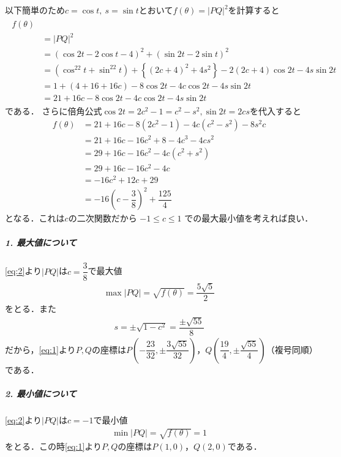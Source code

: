 \documentclass[../../main.tex]{subfiles}
\begin{document}
以下簡単のため$c=\cos t,\ s=\sin t$とおいて$f(\theta)=|PQ|^2$を計算すると
\begin{align}
  \begin{split}
    f(\theta) \\
    &=|PQ|^2 \\
    &=(\cos2t-2\cos t-4)^2+(\sin2t-2\sin t)^2 \\
    &=(\cos^22t+\sin^22t)+\left\{(2c+4)^2+4s^2\right\}-2(2c+4)\cos2t-4s\sin2t \\
    &=1+(4+16+16c)-8\cos 2t - 4c\cos 2t-4s\sin 2t \\
    &=21+16c-8\cos 2t - 4c\cos 2t-4s\sin 2t
  \end{split}
\end{align}
である．
さらに倍角公式$\cos 2t = 2c^2-1 = c^2-s^2, \sin 2t = 2cs$を代入すると
\begin{align}
  f(\theta)
  &= 21+16c-8(2c^2-1) - 4c(c^2-s^2) -8s^2c \\
  &= 21+16c-16c^2+8 -4c^3 -4cs^2 \\
  &= 29+16c-16c^2-4c(c^2+s^2) \\
  &= 29+16c-16c^2-4c \\
  &= -16c^2+12c+29 \\
  &= -16\left(c-\dfrac{3}{8}\right)^2+\dfrac{125}{4} \label{eq:2}
\end{align}
となる．これは$c$の二次関数だから $-1 \le c \le 1$ での最大最小値を考えれば良い．

\subparagraph{1. 最大値について}

\cref{eq:2}より$|PQ|$は$c=\dfrac{3}{8}$で最大値
\begin{align}
  \max |PQ| = \sqrt{f(\theta)} = \dfrac{5\sqrt{5}}{2}
\end{align}
をとる．また
\begin{align}
  s = \pm \sqrt{1-c^2} = \dfrac{\pm \sqrt{55}}{8}
\end{align}
だから，\cref{eq:1}より$P,Q$の座標は$P\left(-\dfrac{23}{32},\pm\dfrac{3\sqrt{55}}{32}\right)$，$Q\left(\dfrac{19}{4},\pm\dfrac{\sqrt{55}}{4}\right)$（複号同順）である．

\subparagraph{2. 最小値について}

\cref{eq:2}より$|PQ|$は$c=-1$で最小値
\begin{align}
  \min |PQ| = \sqrt{f(\theta)} = 1
\end{align}
をとる．この時\cref{eq:1}より$P,Q$の座標は$P(1,0)$，$Q(2,0)$である．

\newpage
\end{document}
